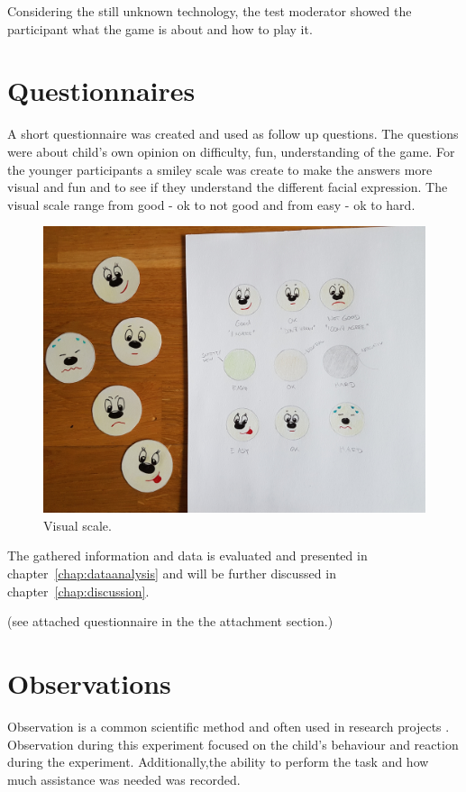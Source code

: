 Considering the still unknown technology, the test moderator showed the participant what the game is about and how to play it. 




\section{Questionnaires}

A short questionnaire was created and used as follow up questions. The questions were about child's own opinion on difficulty, fun, understanding of the game. For the younger participants a smiley scale was create to make the answers more visual and fun and to see if they understand the different facial expression.
The visual scale range from  good - ok to not good and from easy - ok to hard.

\begin{figure}[h]  %
  \centering
  \includegraphics[width=.5\textwidth]{figures/scale.jpg}
  \caption[Visual scale.]{Visual scale.}
  \label{fig:scale}
\end{figure}

The gathered information and data is evaluated and presented in chapter~\ref{chap:dataanalysis} and will be further discussed in chapter~\ref{chap:discussion}.

(see attached questionnaire in the the attachment section.)



\section{Observations}

Observation is a common scientific method and often used in research projects \cite{Leedy2014}. 
Observation during this experiment focused on the child's behaviour and reaction during the experiment. Additionally,the ability to perform the task and how much assistance was needed was recorded.